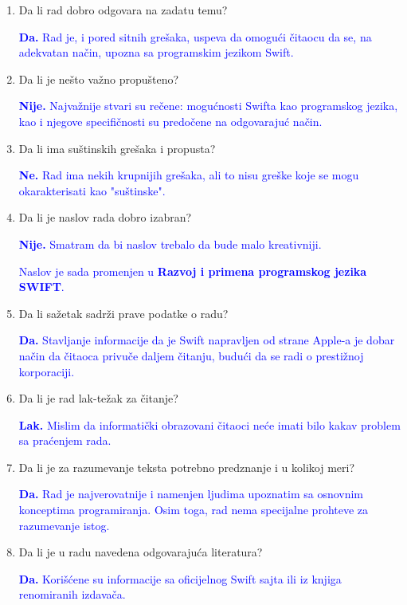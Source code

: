 \documentclass[a4paper]{report}
\newcommand{\odgovor}[1]{\textcolor{blue}{#1}}
\begin{document}
\begin{enumerate}
\item Da li rad dobro odgovara na zadatu temu?

\odgovor{\textbf{Da.} Rad je, i pored sitnih grešaka, uspeva da omogući čitaocu da se, na adekvatan način, upozna sa programskim jezikom Swift.}

\item Da li je nešto važno propušteno?

\odgovor{\textbf{Nije.} Najvažnije stvari su rečene: mogućnosti Swifta kao programskog jezika, kao i njegove specifičnosti su predočene na odgovarajuć način.}

\item Da li ima suštinskih grešaka i propusta?

\odgovor{\textbf{Ne.} Rad ima nekih krupnijih grešaka, ali to nisu greške koje se mogu okarakterisati kao "suštinske".}

\item Da li je naslov rada dobro izabran?

\odgovor{\textbf{Nije.} Smatram da bi naslov trebalo da bude malo kreativniji.}

\odgovor{Naslov je sada promenjen u \textbf{Razvoj i primena programskog jezika SWIFT}.}

\item Da li sažetak sadrži prave podatke o radu?

\odgovor{\textbf{Da.} Stavljanje informacije da je Swift napravljen od strane Apple-a je dobar način da čitaoca privuče daljem čitanju, budući da se radi o prestižnoj korporaciji.}

\item Da li je rad lak-težak za čitanje?

\odgovor{\textbf{Lak.} Mislim da informatički obrazovani čitaoci neće imati bilo kakav problem sa praćenjem rada.}

\item Da li je za razumevanje teksta potrebno predznanje i u kolikoj meri?

\odgovor{\textbf{Da.} Rad je najverovatnije i namenjen ljudima upoznatim sa osnovnim konceptima programiranja. Osim toga, rad nema specijalne prohteve za razumevanje istog.}

\item Da li je u radu navedena odgovarajuća literatura?

\odgovor{\textbf{Da.} Korišćene su informacije sa oficijelnog Swift sajta ili iz knjiga renomiranih izdavača.}


\end{enumerate}
\end{document}
